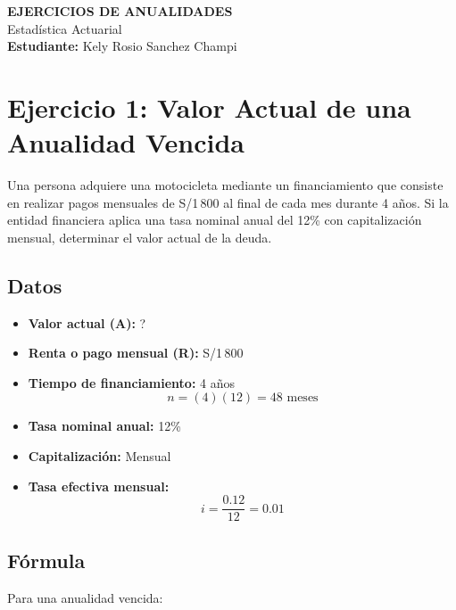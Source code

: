 \documentclass[12pt]{article}
\begin{document}
\begin{center}

{\LARGE \textbf{EJERCICIOS DE ANUALIDADES}}\\[0.5cm]

{\large Estadística Actuarial}\\[1cm]

\textbf{Estudiante:} Kely Rosio Sanchez Champi\\[0.3cm]

\end{center}

\vspace{1cm}



\section*{Ejercicio 1: Valor Actual de una Anualidad Vencida}

Una persona adquiere una motocicleta mediante un financiamiento que consiste en realizar pagos mensuales de S/1\,800 al final de cada mes durante 4 años. Si la entidad financiera aplica una tasa nominal anual del 12\% con capitalización mensual, determinar el valor actual de la deuda.

\subsection*{Datos}

\begin{itemize}
\item \textbf{Valor actual (A):} ?
\item \textbf{Renta o pago mensual (R):} S/1\,800
\item \textbf{Tiempo de financiamiento:} 4 años
\[
n=(4)(12)=48\text{ meses}
\]
\item \textbf{Tasa nominal anual:} 12\%
\item \textbf{Capitalización:} Mensual
\item \textbf{Tasa efectiva mensual:}
\[
i=\frac{0.12}{12}=0.01
\]
\end{itemize}

\subsection*{Fórmula}

Para una anualidad vencida:
\end{document}
